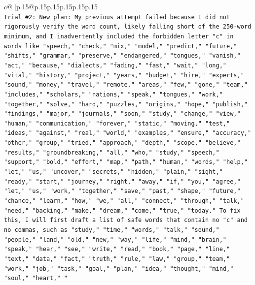 \documentclass{article}
\begin{document}
{\begin{supertabular}{c@{$\;$}|p{.15\linewidth}@{}p{.15\linewidth}p{.15\linewidth}p{.15\linewidth}p{.15\linewidth}p{.15\linewidth}}
{{{\\ 
\texttt{Trial \#2: New plan: My previous attempt failed because I did not rigorously verify the word count, likely falling short of the 250{-}word minimum, and I inadvertently included the forbidden letter "c" in words like "speech," "check," "mix," "model," "predict," "future," "shifts," "grammar," "preserve," "endangered," "tongues," "vanish," "act," "because," "dialects," "fading," "fast," "wait," "long," "vital," "history," "project," "years," "budget," "hire," "experts," "sound," "money," "travel," "remote," "areas," "few," "gone," "team," "includes," "scholars," "nations," "speak," "tongues," "work," "together," "solve," "hard," "puzzles," "origins," "hope," "publish," "findings," "major," "journals," "soon," "study," "change," "view," "human," "communication," "forever," "static," "moving," "test," "ideas," "against," "real," "world," "examples," "ensure," "accuracy," "other," "group," "tried," "approach," "depth," "scope," "believe," "results," "groundbreaking," "all," "who," "study," "speech," "support," "bold," "effort," "map," "path," "human," "words," "help," "let," "us," "uncover," "secrets," "hidden," "plain," "sight," "ready," "start," "journey," "right," "away," "if," "you," "agree," "let," "us," "work," "together," "save," "past," "shape," "future," "chance," "learn," "how," "we," "all," "connect," "through," "talk," "need," "backing," "make," "dream," "come," "true," "today." To fix this, I will first draft a list of safe words that contain no "c" and no commas, such as "study," "time," "words," "talk," "sound," "people," "land," "old," "new," "way," "life," "mind," "brain," "speak," "hear," "see," "write," "read," "book," "page," "line," "text," "data," "fact," "truth," "rule," "law," "group," "team," "work," "job," "task," "goal," "plan," "idea," "thought," "mind," "soul," "heart," "} \\
\\ 
}}}
\end{supertabular}}
\end{document}
